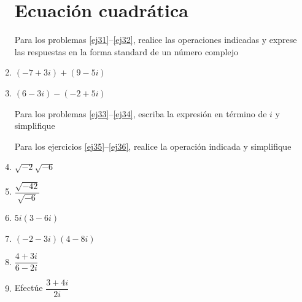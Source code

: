 \documentclass[letterpaper,twoside]{article}
\begin{document}
\begin{multicols}{2}
\begin{enumerate}
\section*{Ecuación cuadrática}
Para los problemas \ref{ej31}--\ref{ej32}, realice las operaciones indicadas y exprese las respuestas en la forma standard de un número complejo
\item \label{ej31} $(-7+3i)+(9-5i)$
\item \label{ej32} $(6-3i)-(-2+5i)$

Para los problemas \ref{ej33}--\ref{ej34}, escriba la expresión en término de $i$ y simplifique
Para los ejercicios \ref{ej35}--\ref{ej36}, realice la operación indicada y simplifique
\item \label{ej35} $\sqrt{-2}\sqrt{-6}$
\item $\dfrac{\sqrt{-42}}{\sqrt{-6}}$
\item $5i(3-6i)$
\item $(-2-3i)(4-8i)$
\item \label{ej36} $\dfrac{4+3i}{6-2i}$
\item Efectúe $\dfrac{3+4i}{2i}$


\end{enumerate}
\end{multicols}
\end{document}

